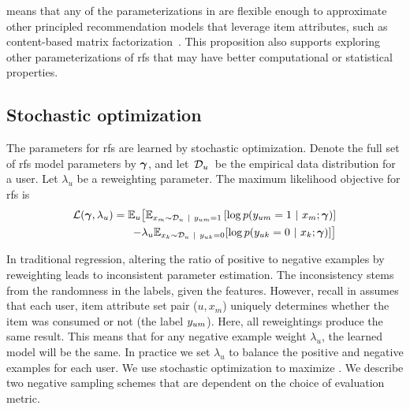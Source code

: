  means that any of the parameterizations in
 are flexible enough to
approximate other principled recommendation models that leverage item
attributes, such as content-based matrix
factorization~\cite{gopalan2014content-based}. This proposition also supports
exploring other parameterizations of \gls{rfs} that may have better
computational or statistical properties.

\subsection{Stochastic optimization}
\label{subsec:rankfromsets:negative-sampling}

The parameters for \acrlong{rfs} are learned by stochastic optimization. Denote
the full set of \gls{rfs} model parameters by $\boldsymbol{\mathbf{\gamma}}$, and let~$\mathcal{D}_u$~be the
empirical data distribution for a user. Let $\lambda_u$ be a reweighting
parameter. The maximum likelihood objective for \gls{rfs} is
\begin{equation}
  \label{eq:objective}
  \begin{aligned}
  \mathcal{L}(\boldsymbol{\mathbf{\gamma}}, \lambda_u) = \mathbb{E}_u\big[ \mathbb{E}_{x_m \sim \mathcal{D}_u ~\vert~ y_{um} = 1}\left[\log p(y_{um} =1 ~\vert~ x_m; \boldsymbol{\mathbf{\gamma}})\right] \\
  - \lambda_u \mathbb{E}_{x_k \sim \mathcal{D}_u ~\vert~ y_{uk} = 0}[\log p(y_{uk} = 0 ~\vert~ x_k; \boldsymbol{\mathbf{\gamma}})]
                \big] \\
  \end{aligned}
\end{equation}

In traditional regression, altering the ratio of positive to negative examples
by reweighting leads to inconsistent parameter estimation. The inconsistency
stems from the randomness in the labels, given the features. However, recall in
 assumes that each user, item attribute set pair ($u, x_m$)
uniquely determines whether the item was consumed or not (the label $y_{um}$).
Here, all reweightings produce the same result. This means that for any negative
example weight $\lambda_u$, the learned model will be the same. In practice we
set $\lambda_u$ to balance the positive and negative examples for each user. We
use stochastic optimization to maximize . We describe two
negative sampling schemes that are dependent on the choice of evaluation metric.

